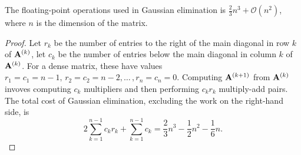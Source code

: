 \begin{thm}
    The floating-point operations used in Gaussian elimination
    is $\frac{2}{3}n^3+\mathcal{O}(n^2)$, where $n$ is the 
    dimension of the matrix.
\end{thm}
\begin{proof}
    Let $r_k$ be the number of entries to the right of the main 
    diagonal in row $k$ of ${\mathbf{A}}^{(k)}$, let $c_k$ be the number 
    of entries below the main diagonal in column $k$ of 
    ${\mathbf{A}}^{(k)}$. For a dense matrix, these have values 
    $r_1=c_1=n-1,\,r_2=c_2=n-2,\ldots\,,r_n=c_n=0$. Computing 
    ${\mathbf{A}}^{(k+1)}$ from ${\mathbf{A}}^{(k)}$ invoves computing $c_k$ 
    multipliers and then performing $c_kr_k$ multiply-add 
    pairs. The total cost of Gaussian elimination, excluding 
    the work on the right-hand side, is
    $$
        2\sum_{k=1}^{n-1}c_kr_k+\sum_{k=1}^{n-1}c_k
        =\frac{2}{3}n^3-\frac{1}{2}n^2-\frac{1}{6}n.
    $$ 
\end{proof}

